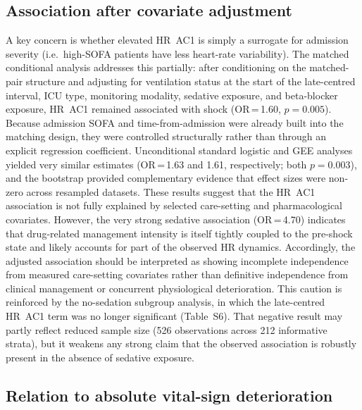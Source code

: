 \documentclass[referee,lineno,pdflatex]{sn-article-template/sn-jnl}
\begin{document}
\subsection{Association after covariate adjustment}

A key concern is whether elevated HR~AC1 is simply a surrogate for admission severity
(i.e.\ high-SOFA patients have less heart-rate variability).
The matched conditional analysis addresses this partially: after conditioning on the
matched-pair structure and adjusting for ventilation status at the start of the late-centred interval,
ICU type, monitoring modality, sedative exposure, and beta-blocker exposure,
HR~AC1 remained associated with shock (OR\,=\,1.60, $p = 0.005$).
Because admission SOFA and time-from-admission were already built into the matching
design, they were controlled structurally rather than through an explicit regression
coefficient.
Unconditional standard logistic and GEE analyses yielded very similar estimates
(OR\,=\,1.63 and 1.61, respectively; both $p = 0.003$),
and the bootstrap provided complementary evidence that effect sizes were non-zero
across resampled datasets.
These results suggest that the HR~AC1 association is not fully explained by selected
care-setting and pharmacological covariates.
However, the very strong sedative association (OR\,=\,4.70) indicates that drug-related
management intensity is itself tightly coupled to the pre-shock state and likely accounts
for part of the observed HR dynamics.
Accordingly, the adjusted association should be interpreted as showing incomplete
independence from measured care-setting covariates rather than definitive independence
from clinical management or concurrent physiological deterioration.
This caution is reinforced by the no-sedation subgroup analysis, in which the late-centred
HR~AC1 term was no longer significant (Table~S6).
That negative result may partly reflect reduced sample size (526 observations across
212 informative strata), but it weakens any strong claim that the observed association
is robustly present in the absence of sedative exposure.

\subsection{Relation to absolute vital-sign deterioration}
\end{document}
